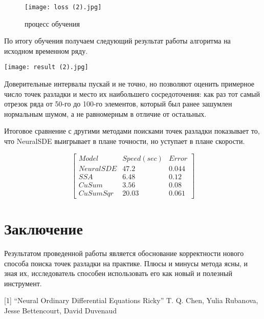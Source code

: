 \documentclass{article}
\begin{document}
   \begin{figure}[h]
    \centering
\texttt{[image: loss (2).jpg]}
    \caption{процесс обучения}
    \label{fig:galaxy}
    \end{figure}

    \par По итогу обучения получаем следующий результат работы алгоритма на исходном временном ряду.


   \centering
   \texttt{[image: result (2).jpg]}
   \label{fig:galaxy}


   \par Доверительные интервалы пускай и не точно, но позволяют оценить примерное число точек разладки и место их наибольшего сосредоточения: как раз тот самый отрезок ряда от 50-го до 100-го элементов, который был ранее зашумлен нормальным шумом, а не равномерным в отличие от остальных.

   \par Итоговое сравнение с другими методами поисками точек разладки показывает то, что NeuralSDE выигрывает в плане точности, но уступает в плане скорости.

   \begin{equation}
 \begin{bmatrix}
   Model & Speed(sec) & Error  \\
   Neural SDE & 47.2 & 0.044 \\
   SSA  & 6.48  & 0.12  \\
   CuSum & 3.56 & 0.08 \\
   CuSumSqr & 20.03 & 0.061
 \end{bmatrix}
\end{equation}
    
\section{Заключение}

   \par Результатом проведенной работы является обоснование корректности нового способа поиска точек разладки на практике. Плюсы и минусы метода ясны, и зная их, исследователь способен использовать его как новый и полезный инструмент.






[1] “Neural Ordinary Differential Equations Ricky” T. Q. Chen, Yulia Rubanova, Jesse Bettencourt, David Duvenaud \\
\end{document}
